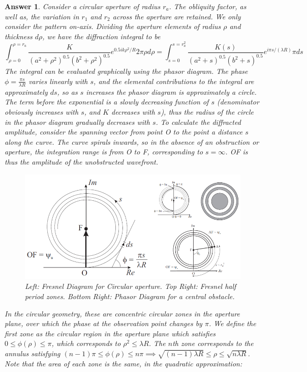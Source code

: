 \documentclass[a4paper]{article}
\newtheorem{ans}{Answer}[subsection]
\theoremstyle{new}
\begin{document}
\begin{ans}
Consider a circular aperture of radius $r_a$. The obliquity factor, as well as, the variation in $r_1$ and $r_2$ across the aperture are retained. We only consider the pattern on-axis. Dividing the aperture elements of radius $\rho$ and thickness $d\rho$, we have the diffraction integral to be
$$\int_{\rho=0}^{\rho=r_a}\frac{K}{(a^2+\rho^2)^{0.5}(b^2+\rho^2)^{0.5}}e^{0.5ik\rho^2/R}2\pi\rho d\rho=\int_{s=0}^{s=r_a^2}\frac{K(s)}{(a^2+s)^{0.5}(b^2+s)^{0.5}}e^{i\pi s/(\lambda R)}\pi ds$$
The integral can be evaluated graphically using the phasor diagram. The phase $\phi=\frac{\pi s}{\lambda R}$ varies linearly with $s$, and the elemental contributions to the integral are approximately $ds$, so as $s$ increases the phasor diagram is approximately a circle. The term before the exponential is a slowly decreasing function of $s$ (denominator obviously increases with $s$, and $K$ decreases with $s$), thus the radius of the circle in the phasor diagram gradually decreases with $s$. To calculate the diffracted amplitude, consider the spanning vector from point O to the point a distance $s$ along the curve. The curve spirals inwards, so in the absence of an obstruction or aperture, the integration range is from O to F, corresponding to $s=\infty$. OF is thus the amplitude of the unobstructed wavefront.
\begin{figure}[H]
    \centering
    \includegraphics[width=\linewidth]{fresnelcircular.PNG}
    \caption{Left: Fresnel Diagram for Circular aperture. Top Right: Fresnel half period zones. Bottom Right: Phasor Diagram for a central obstacle.}
\end{figure}
In the circular geometry, these are concentric circular zones in the aperture plane, over which the phase at the observation point changes by $\pi$. We define the first zone as the circular region in the aperture plane which satisfies $0\leq\phi(\rho)\leq\pi$, which corresponds to $\rho^2\leq\lambda R$. The $n$th zone corresponds to the annulus satisfying $(n-1)\pi\leq\phi(\rho)\leq n\pi\implies\sqrt{(n-1)\lambda R}\leq\rho\leq\sqrt{n\lambda R}$. Note that the area of each zone is the same, in the quadratic approximation:

\end{ans}
\end{document}
